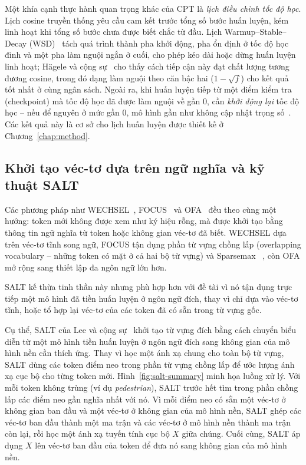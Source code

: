 Một khía cạnh thực hành quan trọng khác của CPT là \textit{lịch điều chỉnh tốc độ học}. Lịch cosine
truyền thống yêu cầu cam kết trước tổng số bước huấn luyện, kém linh hoạt khi tổng số bước
chưa được biết chắc từ đầu. Lịch Warmup--Stable--Decay (WSD)~\cite{hu2024minicpm} tách
quá trình thành pha khởi động, pha ổn định ở tốc độ học đỉnh và một pha làm nguội ngắn ở
cuối, cho phép kéo dài hoặc dừng huấn luyện linh hoạt; Hägele và cộng sự~\cite{hagele2024scaling}
cho thấy cách tiếp cận này đạt chất lượng tương đương cosine, trong đó dạng làm nguội theo
căn bậc hai ($1-\sqrt{f}$) cho kết quả tốt nhất ở cùng ngân sách. Ngoài ra, khi huấn
luyện tiếp từ một điểm kiểm tra (checkpoint) mà tốc độ học đã được làm nguội về gần 0, cần
\textit{khởi động lại} tốc độ học -- nếu để nguyên ở mức gần 0, mô hình gần như không cập
nhật trọng số~\cite{ibrahim2024continual}. Các kết quả này là cơ sở cho lịch huấn luyện được
thiết kế ở Chương~\ref{chap:method}.

\subsection{Khởi tạo véc-tơ dựa trên ngữ nghĩa và kỹ thuật SALT}
\label{subsec:init-methods}

Các phương pháp như WECHSEL~\cite{minixhofer2022wechsel}, FOCUS~\cite{dobler2023focus} và
OFA~\cite{liu2024ofa} đều theo cùng một hướng: token mới không được xem như ký hiệu rỗng,
mà được khởi tạo bằng thông tin ngữ nghĩa từ token hoặc không gian véc-tơ đã biết. WECHSEL
dựa trên véc-tơ tĩnh song ngữ, FOCUS tận dụng phần từ vựng chồng lấp (overlapping
vocabulary -- những token có mặt ở cả hai bộ từ vựng) và Sparsemax
~\cite{martins2016sparsemax}, còn OFA mở rộng sang thiết lập đa ngôn ngữ lớn hơn.

SALT kế thừa tinh thần này nhưng phù hợp hơn với đề tài vì nó tận dụng trực tiếp một mô
hình đã tiền huấn luyện ở ngôn ngữ đích, thay vì chỉ dựa vào véc-tơ tĩnh, hoặc tổ hợp lại
véc-tơ của các token đã có sẵn trong từ vựng gốc.

Cụ thể, SALT của Lee và cộng sự~\cite{lee2025salt} khởi tạo từ vựng đích bằng cách chuyển biểu diễn
từ một mô hình tiền huấn luyện ở ngôn ngữ đích sang không gian của mô hình nền cần thích ứng. Thay vì
học một ánh xạ chung cho toàn bộ từ vựng, SALT dùng các token điểm neo trong phần từ vựng chồng
lấp để ước lượng ánh xạ cục bộ cho từng token mới. Hình~\ref{fig:salt-summary} minh họa
luồng xử lý. Với mỗi token không trùng (ví dụ \textit{pedestrian}), SALT trước hết tìm trong
phần chồng lấp các điểm neo gần nghĩa nhất với nó. Vì mỗi điểm neo có sẵn một véc-tơ ở
không gian ban đầu và một véc-tơ ở không gian của mô hình nền, SALT ghép các véc-tơ ban đầu
thành một ma trận và các véc-tơ ở mô hình nền thành ma trận còn lại, rồi học một ánh xạ
tuyến tính cục bộ $X$ giữa chúng. Cuối cùng, SALT áp dụng $X$ lên véc-tơ ban đầu của token
để đưa nó sang không gian của mô hình nền.

